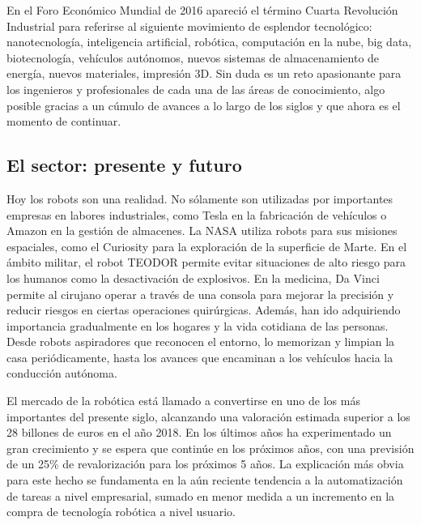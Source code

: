 \documentclass[12pt,spanish,chapterprefix, numbers=noenddot]{book}
\numberwithin{equation}{section}
\numberwithin{figure}{section}
\begin{document}
En el Foro Económico Mundial de 2016 
\cite{forum_2016} apareció el término Cuarta Revolución Industrial para referirse al siguiente movimiento de esplendor tecnológico: nanotecnología, inteligencia artificial, robótica, computación en la nube, big data, biotecnología, vehículos autónomos, nuevos sistemas de almacenamiento de energía, nuevos materiales, impresión 3D. Sin duda es un reto apasionante para los ingenieros y profesionales de cada una de las áreas de conocimiento, algo posible gracias a un cúmulo de avances a lo largo de los siglos y que ahora es el momento de continuar. 


\subsection{El sector: presente y futuro}
Hoy los robots son una realidad. No sólamente son utilizadas por importantes empresas en labores industriales, como Tesla en la fabricación de vehículos o Amazon en la gestión de almacenes. La NASA utiliza robots para sus misiones espaciales, como el Curiosity para la exploración de la superficie de Marte.  En el ámbito militar, el robot TEODOR permite evitar situaciones de alto riesgo para los humanos como la desactivación de explosivos. En la medicina, Da Vinci permite al cirujano operar a través de una consola para mejorar la precisión y reducir riesgos en ciertas operaciones quirúrgicas. Además, han ido adquiriendo importancia gradualmente en los hogares y la vida cotidiana de las personas. Desde robots aspiradores que reconocen el entorno, lo memorizan y limpian la casa periódicamente, hasta los avances que encaminan a los vehículos hacia la conducción autónoma. 

El mercado de la robótica está llamado a convertirse en uno de los más importantes del presente siglo, alcanzando una valoración estimada superior a los 28 billones de euros en el año 2018. En los últimos años ha experimentado un gran crecimiento y se espera que continúe en los próximos años, con una previsión de un 25\% de revalorización para los próximos 5 años. 
La explicación más obvia para este hecho se fundamenta en la aún reciente tendencia a la automatización de tareas a nivel empresarial, sumado en menor medida a un incremento en la compra de tecnología robótica a nivel usuario.
\end{document}
